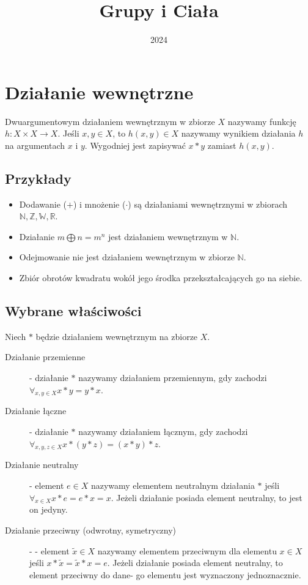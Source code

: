 \documentclass{article}
\title{Grupy i Ciała}
\date{2024}
\begin{document}
\maketitle

\section{Działanie wewnętrzne}
Dwuargumentowym działaniem wewnętrznym w zbiorze $X$ nazywamy funkcję $h : X \times X \rightarrow X$.
Jeśli $x, y \in X$, to $h(x, y) \in X$ nazywamy wynikiem działania $h$ na argumentach $x$ i $y$.
Wygodniej jest zapisywać $x * y$ zamiast $h(x, y)$.

\subsection{Przykłady}
\begin{itemize}
    \item Dodawanie ($+$) i mnożenie ($\cdot$) są działaniami wewnętrznymi w zbiorach $\mathbb{N}, \mathbb{Z}, \mathbb{W}, \mathbb{R}$.
    \item Działanie $m \bigoplus n = m^n$ jest działaniem wewnętrznym w $\mathbb{N}$.
    \item Odejmowanie nie jest działaniem wewnętrznym w zbiorze $\mathbb{N}$.
    \item Zbiór obrotów kwadratu wokół jego środka przekształcających go na siebie.
\end{itemize}

\subsection{Wybrane właściwości}
Niech $*$ będzie działaniem wewnętrznym na zbiorze $X$.
\begin{description}
    \item[Działanie przemienne] - działanie $*$ nazywamy działaniem przemiennym, gdy zachodzi $\forall_{x,y \in X} x * y = y * x$.
    \item[Działanie łączne] - działanie $*$ nazywamy działaniem łącznym, gdy zachodzi $\forall_{x,y,z \in X} x * (y * z) = (x * y) * z$.
    \item[Działanie neutralny] - element $e \in X$ nazywamy elementem neutralnym działania $*$ jeśli $\forall_{x \in X} x * e = e * x = x$. Jeżeli działanie posiada element neutralny, to jest on jedyny.
    \item[Działanie przeciwny (odwrotny, symetryczny)] - - element $\tilde{x} \in X$ nazywamy elementem przeciwnym dla elementu $x \in X$ jeśli $x * \tilde{x} = \tilde{x} * x = e$.
Jeżeli działanie posiada element neutralny, to element przeciwny do dane-
go elementu jest wyznaczony jednoznacznie.
\end{description}
\end{document}
